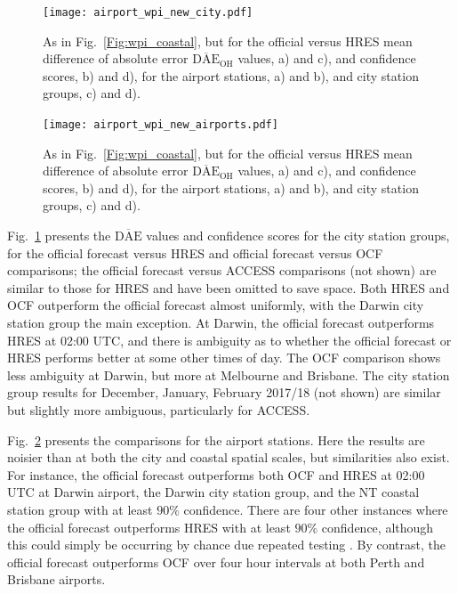 \documentclass[twocol]{ametsoc}
\begin{document}
\begin{figure}
\centering
\texttt{[image: airport\_wpi\_new\_city.pdf]}
\caption{As in Fig.~\ref{Fig:wpi_coastal}, but for the official versus HRES mean difference of absolute error $\overline{\text{DAE}}_\text{OH}$ values, a) and c), and confidence scores, b) and d), for the airport stations, a) and b), and city station groups, c) and d).}
\label{Fig:city_wpi}
\end{figure}

\begin{figure}
\centering
\texttt{[image: airport\_wpi\_new\_airports.pdf]}
\caption{As in Fig.~\ref{Fig:wpi_coastal}, but for the official versus HRES mean difference of absolute error $\overline{\text{DAE}}_\text{OH}$ values, a) and c), and confidence scores, b) and d), for the airport stations, a) and b), and city station groups, c) and d).}
\label{Fig:airport_wpi}
\end{figure}

Fig.~\ref{Fig:city_wpi} presents the $\overline{\text{DAE}}$ values and confidence scores for the city station groups, for the official forecast versus HRES and official forecast versus OCF comparisons; the official forecast versus ACCESS comparisons (not shown) are similar to those for HRES and have been omitted to save space. Both HRES and OCF outperform the official forecast almost uniformly, with the Darwin city station group the main exception. At Darwin, the official forecast outperforms HRES at 02:00 UTC, and there is ambiguity as to whether the official forecast or HRES performs better at some other times of day. The OCF comparison shows less ambiguity at Darwin, but more at Melbourne and Brisbane. The city station group results for December, January, February 2017/18 (not shown) are similar but slightly more ambiguous, particularly for ACCESS.  

Fig.~\ref{Fig:airport_wpi} presents the comparisons for the airport stations. Here the results are noisier than at both the city and coastal spatial scales, but similarities also exist. For instance, the official forecast outperforms both OCF and HRES at 02:00 UTC at Darwin airport, the Darwin city station group, and the NT coastal station group with at least $90\%$ confidence. There are four other instances where the official forecast outperforms HRES with at least $90\%$ confidence, although this could simply be occurring by chance due repeated testing \citep[p. 178]{wilks11}. By contrast, the official forecast outperforms OCF over four hour intervals at both Perth and Brisbane airports.
\end{document}

